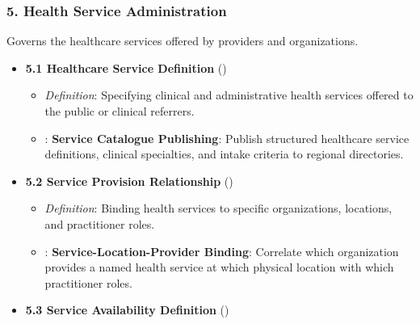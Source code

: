 \subsubsection*{5. Health Service Administration}
\label{rad:enabling:190}

Governs the healthcare services offered by providers and organizations.

\label{rad:enabling:192}

\begin{itemize}

\item 
\textbf{5.1 Healthcare Service Definition} (\texttt{})


\begin{itemize}

\item 
\emph{Definition}: Specifying clinical and administrative health services offered to the public or clinical referrers.



\item 
\texttt{}: \textbf{Service Catalogue Publishing}: Publish structured healthcare service definitions, clinical specialties, and intake criteria to regional directories.



\end{itemize}


\item 
\textbf{5.2 Service Provision Relationship} (\texttt{})


\begin{itemize}

\item 
\emph{Definition}: Binding health services to specific organizations, locations, and practitioner roles.



\item 
\texttt{}: \textbf{Service-Location-Provider Binding}: Correlate which organization provides a named health service at which physical location with which practitioner roles.



\end{itemize}


\item 
\textbf{5.3 Service Availability Definition} (\texttt{})



\end{itemize}
